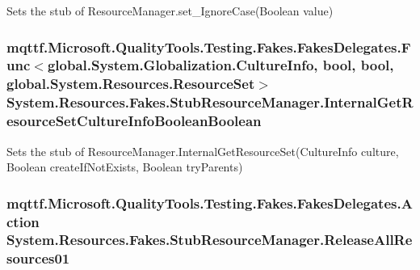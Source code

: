 Sets the stub of Resource\-Manager.\-set\-\_\-\-Ignore\-Case(\-Boolean value)

\hypertarget{class_system_1_1_resources_1_1_fakes_1_1_stub_resource_manager_aba1161d37868b5d33d0a35271047592c}{
\subsubsection[{Internal\-Get\-Resource\-Set\-Culture\-Info\-Boolean\-Boolean}]{\setlength{\rightskip}{0pt plus 5cm}mqttf.\-Microsoft.\-Quality\-Tools.\-Testing.\-Fakes.\-Fakes\-Delegates.\-Func$<$global.\-System.\-Globalization.\-Culture\-Info, bool, bool, global.\-System.\-Resources.\-Resource\-Set$>$ System.\-Resources.\-Fakes.\-Stub\-Resource\-Manager.\-Internal\-Get\-Resource\-Set\-Culture\-Info\-Boolean\-Boolean}}\label{class_system_1_1_resources_1_1_fakes_1_1_stub_resource_manager_aba1161d37868b5d33d0a35271047592c}


Sets the stub of Resource\-Manager.\-Internal\-Get\-Resource\-Set(\-Culture\-Info culture, Boolean create\-If\-Not\-Exists, Boolean try\-Parents)

\hypertarget{class_system_1_1_resources_1_1_fakes_1_1_stub_resource_manager_a20ca0647cc564db40e054b674311b927}{
\subsubsection[{Release\-All\-Resources01}]{\setlength{\rightskip}{0pt plus 5cm}mqttf.\-Microsoft.\-Quality\-Tools.\-Testing.\-Fakes.\-Fakes\-Delegates.\-Action System.\-Resources.\-Fakes.\-Stub\-Resource\-Manager.\-Release\-All\-Resources01}}\label{class_system_1_1_resources_1_1_fakes_1_1_stub_resource_manager_a20ca0647cc564db40e054b674311b927}


